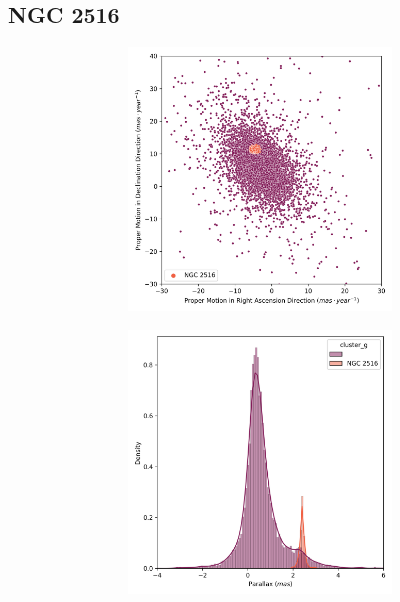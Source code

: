 \documentclass[11pt, a4paper, english]{book}
\begin{document}
\subsection{NGC 2516}

\begin{figure}[H]
  \centering
  \begin{subfigure}{0.9\textwidth}
    \centering
    \begin{subfigure}[t]{0.30\textwidth}
      \centering
      \includegraphics[width=\textwidth]{../figures/ngc_2516/pm_ngc_2516.png}
    \end{subfigure}
    \hfill
    \begin{subfigure}[t]{0.30\textwidth}
      \centering
      \includegraphics[width=\textwidth]{../figures/ngc_2516/parallax_ngc_2516.png}

\end{subfigure}
\end{subfigure}
\end{figure}
\end{document}

